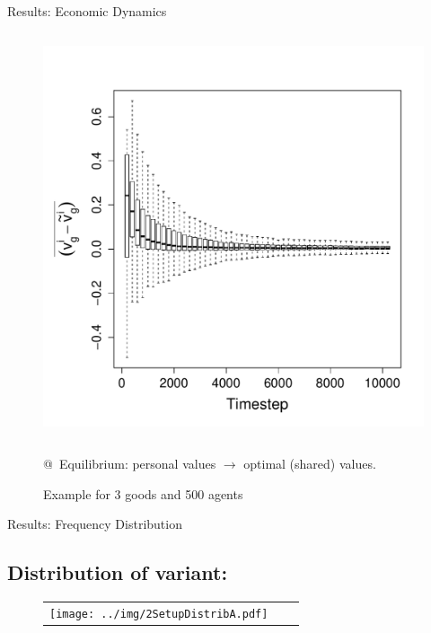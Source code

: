\documentclass[12pt, handout=show,notes=show]{beamer}
\begin{document}
\begin{frame}{Results: Economic Dynamics}
	\begin{figure}
	    \caption{Example for 3 goods and 500 agents}
	    \begin{columns}
		\includegraphics[height=\textwidth]{images/ClearingPriceDistanceEvolutionForTrade-G3N500.pdf}\\
	    \end{columns}
		@~Equilibrium: personal values  $\rightarrow$ optimal (shared) values.
	\end{figure}
	
\end{frame}

\begin{frame}{Results: Frequency Distribution}
    \subsection*{Distribution of variant:}
    \begin{figure}[!h]
	\begin{center}
	    \begin{tabular}{ccc}
		\texttt{[image: ../img/2SetupDistribA.pdf]}\\
	    \end{tabular}

	\end{center}
    \end{figure}
\end{frame}
\end{document}
